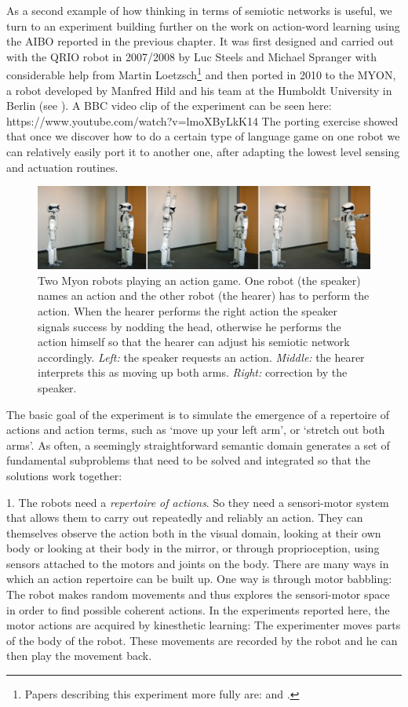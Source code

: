 As a second example of how thinking in terms of semiotic networks is useful,
we turn to an experiment building further on the work on action-word learning 
using the AIBO reported in the previous chapter.
It was first designed and carried out with the QRIO robot in 2007/2008 by Luc Steels and
Michael Spranger with considerable help from Martin Loetzsch\footnote{Papers describing this experiment more fully are: 
\cite{Steels:2008spatial} and \cite{Steels:2008b}.} and 
then ported in 2010 to the MYON, a robot developed by Manfred Hild and his team at the Humboldt 
University in Berlin (see ).\cite{Steels:2012b}
A BBC video clip of the experiment can be seen here: https://www.youtube.com/watch?v=lmoXByLkK14
The porting exercise showed that once we discover how to do a certain type of language game on one robot 
we can relatively easily port it to another one, after adapting the lowest level sensing and actuation routines. 
\begin{figure}[htbp]
  \centerline{\includegraphics[width=1.0\textwidth]{chap11/figs/myon-action-game}}
\caption{\footnotesize
Two Myon robots playing an action game. One robot (the speaker) names an action and the other robot (the hearer) 
has to perform the action. When the hearer performs the right action the speaker signals success by nodding the head, 
otherwise he performs the action himself so that the hearer can adjust his semiotic network accordingly. {\it Left:} the speaker
requests an action. {\it Middle:} the hearer interprets this as moving up both arms. {\it Right:} correction by the speaker. 
}\label{fig:myon-action} 
\end{figure}

The basic goal of the experiment is to simulate the emergence of a repertoire of actions and action terms, such as 
`move up your left arm', or `stretch out both arms'. As often, a seemingly straightforward semantic domain generates 
a set of fundamental subproblems that need to be solved and integrated so that the solutions work together: 

1. The robots need a {\it repertoire of actions}. So they need a sensori-motor system that allows them to carry out 
repeatedly and reliably an action. They can themselves observe the action both in the visual domain,  
looking at their own body or looking at their body in the mirror, or through proprioception, using sensors attached 
to the motors and joints on the body. There are many ways in which an action repertoire can be built up. One way 
is through motor babbling: The robot makes random movements and thus explores the sensori-motor 
space in order to find possible coherent actions. In the experiments reported here, the motor actions are acquired 
by kinesthetic learning: The experimenter moves parts of the body of the robot. These movements are recorded by the robot
and he can then play the movement back. 

